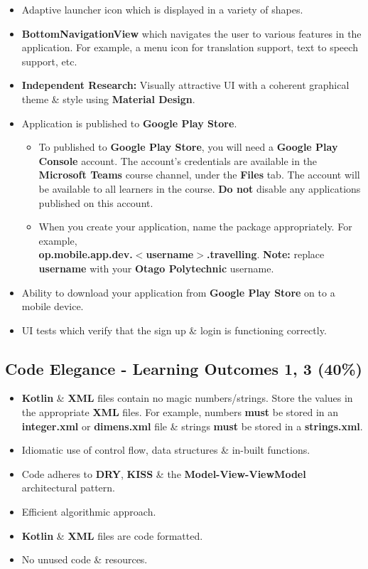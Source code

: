 \documentclass{article}
\begin{document}
\begin{itemize}
	\item Adaptive launcher icon which is displayed in a variety of shapes.
	\item \textbf{BottomNavigationView} which navigates the user to various features in the application. For example, a menu icon for translation support, text to speech support, etc.
	\item \textbf{Independent Research:} Visually attractive UI with a coherent graphical theme \& style using \textbf{Material Design}.
	\item Application is published to \textbf{Google Play Store}.
	      \begin{itemize}
	      	\item To published to \textbf{Google Play Store}, you will need a \textbf{Google Play Console} account. The account's credentials are available in the \textbf{Microsoft Teams} course channel, under the \textbf{Files} tab. The account will be available to all learners in the course. \textbf{Do not} disable any applications published on this account.
	      	\item When you create your application, name the package appropriately. For example, \\ \textbf{op.mobile.app.dev.$<$username$>$.travelling}. \textbf{Note:} replace \textbf{username} with your \textbf{Otago Polytechnic} username.
	      \end{itemize}
	\item Ability to download your application from \textbf{Google Play Store} on to a mobile device.
	\item UI tests which verify that the sign up \& login is functioning correctly.
\end{itemize}

\subsection*{Code Elegance - Learning Outcomes 1, 3 (40\%)}
\begin{itemize}
	\item \textbf{Kotlin} \& \textbf{XML} files contain no magic numbers/strings. Store the values in the appropriate \textbf{XML} files. For example, numbers \textbf{must} be stored in an \textbf{integer.xml} or \textbf{dimens.xml} file \& strings \textbf{must} be stored in a \textbf{strings.xml}.
	\item Idiomatic use of control flow, data structures \& in-built functions.
	\item Code adheres to \textbf{DRY}, \textbf{KISS} \& the \textbf{Model-View-ViewModel} architectural pattern.
	\item Efficient algorithmic approach.
	\item \textbf{Kotlin} \& \textbf{XML} files are code formatted.
	\item No unused code \& resources.
\end{itemize}
\end{document}
